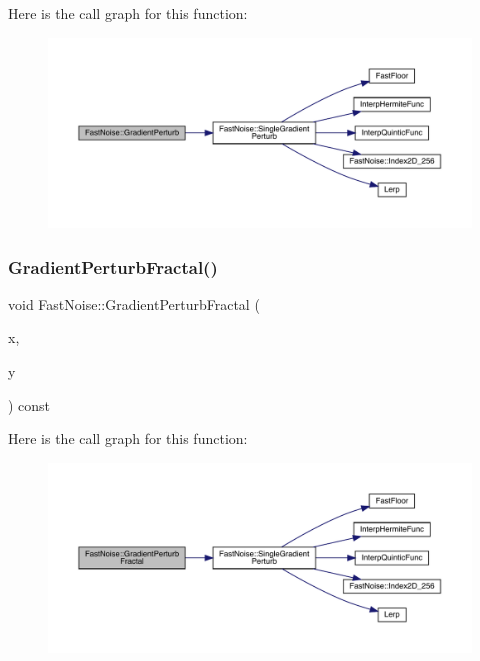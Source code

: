 Here is the call graph for this function\+:
\nopagebreak
\begin{figure}[H]
\begin{center}
\leavevmode
\includegraphics[width=350pt]{d1/dd8/class_fast_noise_a24007877680a6d0f45ea1d7f209ee6f1_cgraph}
\end{center}
\end{figure}
\mbox{\label{class_fast_noise_ab3d6570d2a46f693ef4c63f10ea872ca}} 
\subsubsection{\texorpdfstring{Gradient\+Perturb\+Fractal()}{GradientPerturbFractal()}\hspace{0.1cm}{\footnotesize\ttfamily [1/2]}}
{\footnotesize\ttfamily void Fast\+Noise\+::\+Gradient\+Perturb\+Fractal (\begin{DoxyParamCaption}\item[{\mbox{\hyperlink{_fast_noise_8h_a75a9ef6d2541c4921815b885bfd449c3}{F\+N\+\_\+\+D\+E\+C\+I\+M\+AL}} \&}]{x,  }\item[{\mbox{\hyperlink{_fast_noise_8h_a75a9ef6d2541c4921815b885bfd449c3}{F\+N\+\_\+\+D\+E\+C\+I\+M\+AL}} \&}]{y }\end{DoxyParamCaption}) const}

Here is the call graph for this function\+:
\nopagebreak
\begin{figure}[H]
\begin{center}
\leavevmode
\includegraphics[width=350pt]{d1/dd8/class_fast_noise_ab3d6570d2a46f693ef4c63f10ea872ca_cgraph}
\end{center}
\end{figure}
\mbox{\label{class_fast_noise_a155a219f6356b75e3dfc2610d03e801a}} 
